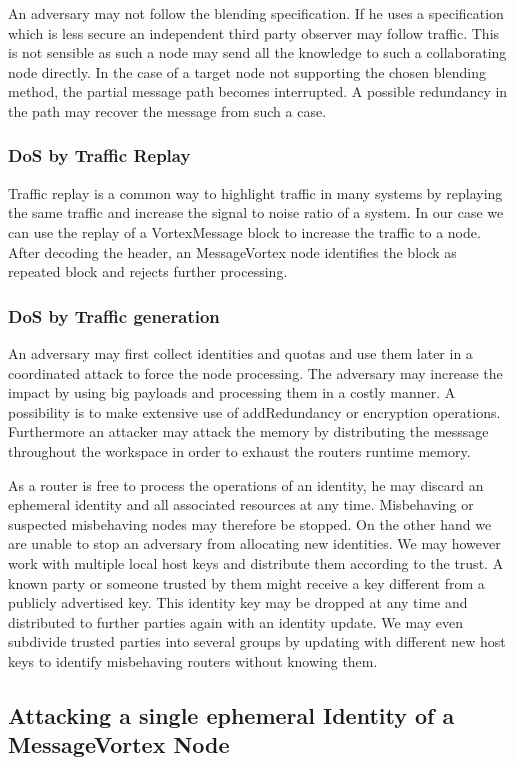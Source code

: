 An adversary may not follow the blending specification. If he uses a specification which is less secure an independent third party observer may follow traffic. This is not sensible as such a node may send all the knowledge to such a collaborating node directly. In the case of a  target node not supporting the chosen blending method, the partial message path becomes interrupted. A possible redundancy in the path may recover the message from such a case.

\subsubsection{DoS by Traffic Replay}
Traffic replay is a common way to highlight traffic in many systems by replaying the same traffic and increase the signal to noise ratio of a system. In our case we can use the replay of a VortexMessage block to increase the traffic to a node. After decoding the header, an MessageVortex node identifies the block as repeated block and rejects further processing. 

\subsubsection{DoS by Traffic generation}
An adversary may first collect identities and quotas and use them later in a coordinated attack to force the node processing. The adversary may increase the impact by using big payloads and processing them in a costly manner. A possibility is to make extensive use of addRedundancy or encryption operations. Furthermore an attacker may attack the memory by distributing the messsage throughout the workspace in order to exhaust the routers runtime memory.

As a router is free to process the operations of an identity, he may discard an ephemeral identity and all associated resources at any time. Misbehaving or suspected misbehaving nodes may therefore be stopped. On the other hand we are unable to stop an adversary from allocating new identities. We may however work with multiple local host keys and distribute them according to the trust. A known party or someone trusted by them might receive a key different from a publicly advertised key. This identity key may be dropped at any time and distributed to further parties again with an identity update. We may even subdivide trusted parties into several groups by updating with different new host keys to identify misbehaving routers without knowing them. 

\subsection{Attacking a single ephemeral Identity of a MessageVortex Node}

